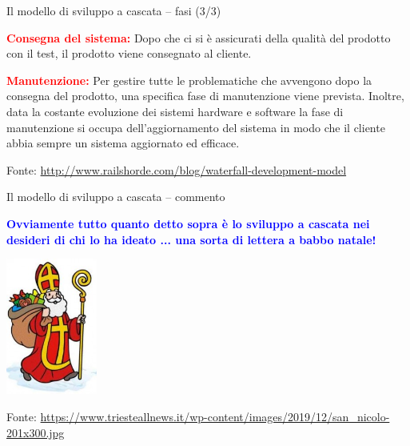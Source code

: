 \documentclass{beamer}
\begin{document}
\begin{frame}{\centerline{Il modello di sviluppo a cascata -- fasi (3/3)}}



\textcolor{red}{\bf Consegna del sistema:} Dopo che ci si \`{e} assicurati della qualit\`{a} del prodotto con il test, il prodotto viene consegnato al cliente.
\newline

\textcolor{red}{\bf Manutenzione:} Per gestire tutte le problematiche che avvengono dopo la consegna del prodotto, una specifica fase di manutenzione viene prevista. Inoltre, data la costante evoluzione dei sistemi hardware e software la fase di manutenzione si occupa dell'aggiornamento del sistema in modo che il cliente abbia sempre un sistema aggiornato ed efficace.

\newline

\begin{center}
\tiny
Fonte: \url{http://www.railshorde.com/blog/waterfall-development-model}
\end{center}

\end{frame}

\begin{frame}{\centerline{Il modello di sviluppo a cascata -- commento}}

\textcolor{blue}{\bf Ovviamente tutto quanto detto sopra \`{e} lo sviluppo a cascata nei desideri di chi lo ha ideato ... una sorta di lettera a babbo natale!}

\begin{center}
\includegraphics[width=30mm]{P2023.AIBCCSS.IlConcettoDiSoftware/san_nicolo-201x300.jpg}
\end{center}
\vspace{0.5cm}

\begin{center}
\tiny
Fonte: \url{https://www.triesteallnews.it/wp-content/images/2019/12/san_nicolo-201x300.jpg}
\end{center}


\end{frame}
\end{document}
